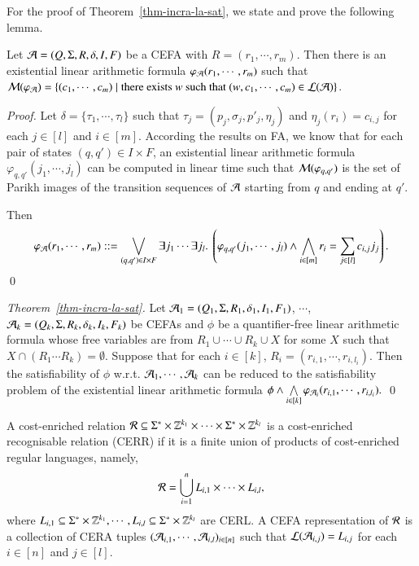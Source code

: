 \documentclass{llncs}
\begin{document}
For the proof of Theorem~\ref{thm-incra-la-sat}, we state and prove the following lemma. 

\begin{lemma}\label{lem-incra-la}
Let $\mathcal{A}=(Q, \Sigma, R, \delta, I, F)$ be a CEFA with $R= (r_1, \cdots,  r_m)$. Then there is an existential linear arithmetic formula $\varphi_{\mathcal{A}}(r_1, \cdots, r_m)$ such that $\mathcal{M}(\varphi_{\mathcal{A}})= \{(c_1, \cdots, c_m) \mid \mbox{there exists } w \mbox{ such that } (w, c_1, \cdots, c_m) \in \mathcal{L}(\mathcal{A})\}$.
\end{lemma}

\begin{proof}
Let $\delta = \{\tau_1, \cdots, \tau_l\}$ such that $\tau_j = (p_j, \sigma_j, p'_j, \eta_j)$ and $\eta_j(r_i) =  c_{i,j}$ for each $j \in [l]$ and $i \in [m]$.
According the results on FA, we know that for each pair of states $(q, q') \in I \times F$,  an existential linear arithmetic formula $\varphi_{q,q'}(j_1, \cdots, j_l)$ can be computed in linear time such that $\mathcal{M}(\varphi_{q,q'})$ is the set of Parikh images of the transition sequences of $\mathcal{A}$ starting from $q$ and ending at $q'$. 

Then 
\[\varphi_\Aut(r_1, \cdots, r_m) ::= \bigvee \limits_{(q,q') \in I \times F} \exists j_1 \cdots \exists j_l.\ \left(\varphi_{q,q'}(j_1, \cdots, j_l) \wedge \bigwedge \limits_{i \in [m]} r_i = \sum \limits_{j \in [l]} c_{i,j} j_j \right).\]
\qed
\end{proof}

\begin{proof}[Theorem~\ref{thm-incra-la-sat}]
Let $\mathcal{A}_1=(Q_1, \Sigma, R_1, \delta_1, I_1, F_1)$, $\cdots$, $\mathcal{A}_k=(Q_k, \Sigma, R_k, \delta_k, I_k, F_k)$ be CEFAs and $\phi$ be a quantifier-free linear arithmetic formula whose free variables are from  $R_1 \cup \cdots \cup R_k \cup X$ for some $X$ such that $X \cap (R_1 \cdots R_k) = \emptyset$.
Suppose that for each $i \in [k]$, $R_i = (r_{i, 1}, \cdots, r_{i, l_i})$. Then the satisfiability of $\phi$ w.r.t. $\mathcal{A}_1,\cdots, \mathcal{A}_k$ can be reduced to the satisfiability problem of the  existential linear arithmetic formula
$
\phi \wedge \bigwedge \limits_{i \in [k]} \varphi_{\mathcal{A}_i}(r_{i,1}, \cdots, r_{i, l_i}).
$
\qed
\end{proof}

\begin{definition}
A cost-enriched relation $\mathcal{R} \subseteq \Sigma^* \times \mathbb{Z}^{k_1} \times \cdots  \times \Sigma^* \times \mathbb{Z}^{k_l}$ is a cost-enriched recognisable relation (CERR)  if it is a finite union of products of cost-enriched regular languages, namely, 
\[\mathcal{R} = \bigcup \limits_{i=1}^n L_{i,1 } \times \cdots \times L_{i, l},\]
where $L_{i,1} \subseteq \Sigma^* \times \mathbb{Z}^{k_1}, \cdots, L_{i, l} \subseteq \Sigma^* \times \mathbb{Z}^{k_l}$ are CERL. 
A CEFA representation of $\mathcal{R}$ is a collection of CERA tuples $(\mathcal{A}_{i,1}, \cdots, \mathcal{A}_{i,l})_{i \in [n]}$ such that $\mathcal{L}(\mathcal{A}_{i,j}) = L_{i,j}$ for each $i \in [n]$ and $j \in [l]$.
\end{definition}
\end{document}
